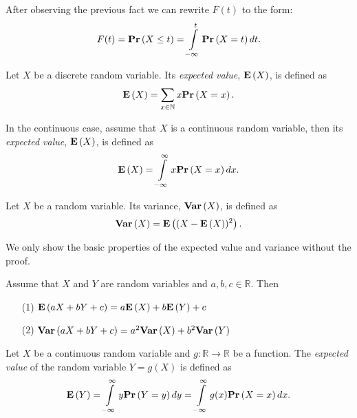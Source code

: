 After observing the previous fact we can rewrite $F(t)$ to the form:
\[
F(t) = \mathbf{Pr}\left(X \leq t\right) = \int\limits_{-\infty}^{t} \mathbf{Pr}\left(X = t\right) dt \text{.}
\]

\begin{definition}
Let $X$ be a discrete random variable. Its \emph{expected value}, $\mathbf{E}\left(X\right)$, is defined as
\[
\mathbf{E}\left(X\right) = \displaystyle\sum_{x \in \mathbb{N}} x \mathbf{Pr}\left(X = x\right) \text{.}
\]

In the continuous case, assume that $X$ is a continuous random variable, then its \emph{expected value}, $\mathbf{E}\left(X\right)$, is defined as
\[
\mathbf{E}\left(X\right) = \int\limits_{-\infty}^{\infty} x \mathbf{Pr}\left(X = x\right) dx \text{.}
\]
\end{definition}

\begin{definition}[Variance]
Let $X$ be a random variable. Its variance, $\mathbf{Var}\left(X\right)$, is defined as \[ \mathbf{Var}\left(X\right) = \mathbf{E}\left((X - \mathbf{E}\left(X\right)) ^ 2\right) \text{.} \]
\end{definition}

We only show the basic properties of the expected value and variance without the proof. 
\begin{lemma}
Assume that $X$ and $Y$ are random variables and $a, b, c \in \mathbb{R}$. Then
\label{lemma-expected-value-properties}
\begin{enumerate}
\item[(1)] $\mathbf{E}\left(aX + bY + c\right) = a\mathbf{E}\left(X\right) + b\mathbf{E}\left(Y\right) + c$
\item[(2)] $\mathbf{Var}\left(aX + bY + c\right) = a ^ 2 \mathbf{Var}\left(X\right) + b ^ 2 \mathbf{Var}\left(Y\right)$
\end{enumerate}
\end{lemma}

\begin{definition}
Let $X$ be a continuous random variable and $g: \mathbb{R} \rightarrow \mathbb{R}$ be a function. The \emph{expected value} of the random variable $Y = g(X)$ is defined as
\[
\mathbf{E}\left(Y\right) = \int\limits_{-\infty}^{\infty} y\mathbf{Pr}\left(Y = y\right) dy = \int\limits_{-\infty}^{\infty} g(x)\mathbf{Pr}\left(X = x\right) dx \text{.}
\]
\end{definition}

